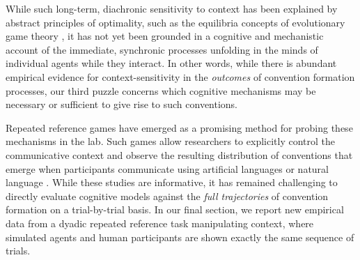 While such long-term, diachronic sensitivity to context has been explained by abstract principles of optimality, such as the equilibria concepts of evolutionary game theory \cite{jager2007evolution,jager2007language}, it has not yet been grounded in a cognitive and mechanistic account of the immediate, synchronic processes unfolding in the minds of individual agents while they interact.
In other words, while there is abundant empirical evidence for context-sensitivity in the \emph{outcomes} of convention formation processes, our third puzzle concerns which cognitive mechanisms may be necessary or sufficient to give rise to such conventions.

Repeated reference games have emerged as a promising method for probing these mechanisms in the lab. 
Such games allow researchers to  explicitly control the communicative context and observe the resulting distribution of conventions that emerge when participants communicate using artificial languages \cite{WintersKirbySmith14_LanguagesAdapt, KirbyTamarizCornishSmith15_CompressionCommunication,winters2018contextual} or natural language \cite{hawkins2020characterizing}.
While these studies are informative, it has remained challenging to directly evaluate cognitive models against the \emph{full trajectories} of convention formation on a trial-by-trial basis.
In our final section, we report new empirical data from a dyadic repeated reference task manipulating context, where simulated agents and human participants are shown exactly the same sequence of trials.

